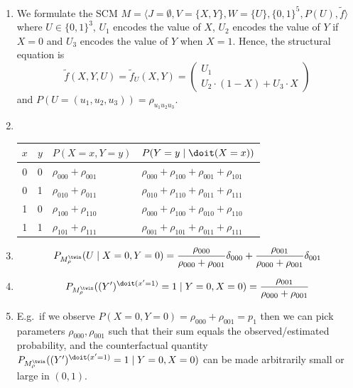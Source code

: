 \begin{enumerate}[label=12.\arabic*]
	\begin{ungradedsolution}
		\begin{enumerate}
			\item
			We formulate the SCM $M=\langle J=\emptyset, V=\{X, Y\}, W=\{U\}, \{0,1\}^5, P(U), \tilde{f} \rangle$
			where $U \in \{0,1\}^3$, $U_1$ encodes the value of $X$, $U_2$ encodes the value of $Y$ if $X=0$ and $U_3$ encodes the value of $Y$ when $X=1$. Hence, the structural equation is
			$$\tilde{f}(X, Y, U) = \tilde{f}_U(X, Y) = \begin{pmatrix}
					U_1 \\
					U_2\cdot(1-X) + U_3\cdot X
				\end{pmatrix}$$
			and $P(U=(u_1,u_2,u_3)) = \rho_{u_1u_2u_3}$.
			\item ~\\
			\begin{center}
				\begin{tabular}{ccll}
					$x$ & $y$ & $P(X=x, Y=y)$             & $P(Y=y\mid\doit(X=x))$                              \\
					\hline
					0   & 0   & $\rho_{000} + \rho_{001}$ & $\rho_{000} + \rho_{100} + \rho_{001} + \rho_{101}$ \\
					0   & 1   & $\rho_{010} + \rho_{011}$ & $\rho_{010} + \rho_{110} + \rho_{011} + \rho_{111}$ \\
					1   & 0   & $\rho_{100} + \rho_{110}$ & $\rho_{000} + \rho_{100} + \rho_{010} + \rho_{110}$ \\
					1   & 1   & $\rho_{101} + \rho_{111}$ & $\rho_{001} + \rho_{101} + \rho_{011} + \rho_{111}$
				\end{tabular}
			\end{center}
			\item
			$$P_{M_{\rho}^{\twin}}(U \mid X=0,Y=0) = \frac{\rho_{000}}{\rho_{000} + \rho_{001}} \delta_{000} + \frac{\rho_{001}}{\rho_{000} + \rho_{001}} \delta_{001}$$
			\item
			$$P_{M_{\rho}^{\twin}}((Y')^{\doit(x'=1)}=1\mid Y=0,X=0) = \frac{\rho_{001}}{\rho_{000} + \rho_{001}}$$
			\item
			E.g.\ if we observe $P(X=0,Y=0) = \rho_{000} + \rho_{001} = p_1$ then we can pick parameters $\rho_{000}, \rho_{001}$ such that their sum equals the observed/estimated probability, and the counterfactual quantity $P_{M_{\rho}^{\twin}}((Y')^{\doit(x'=1)}=1\mid Y=0,X=0)$ can be made arbitrarily small or large in $(0,1)$.
		\end{enumerate}
	\end{ungradedsolution}
\end{enumerate}

